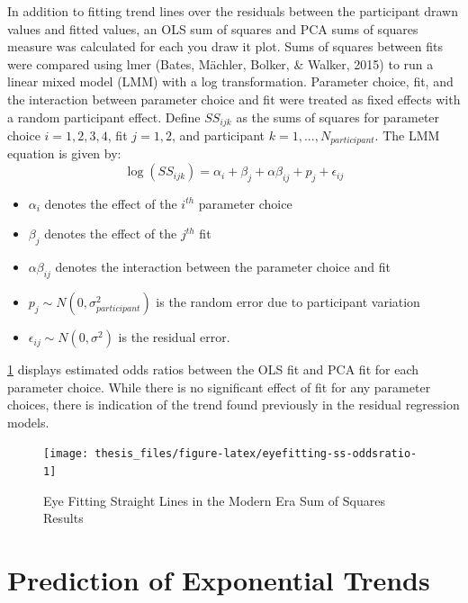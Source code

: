\documentclass[print]{nuthesis}
\providecommand{\tightlist}{%
  \setlength{\itemsep}{0pt}\setlength{\parskip}{0pt}}
\begin{document}
In addition to fitting trend lines over the residuals between the participant drawn values and fitted values, an OLS sum of squares and PCA sums of squares measure was calculated for each you draw it plot.
Sums of squares between fits were compared using lmer (Bates, Mächler, Bolker, \& Walker, 2015) to run a linear mixed model (LMM) with a log transformation.
Parameter choice, fit, and the interaction between parameter choice and fit were treated as fixed effects with a random participant effect.
Define \(SS_{ijk}\) as the sums of squares for parameter choice \(i = 1,2,3,4\), fit \(j=1,2\), and participant \(k = 1,...,N_{participant}\).
The LMM equation is given by:
\begin{equation}
\log\left(SS_{ijk}\right) = \alpha_i + \beta_j + \alpha\beta_{ij} + p_{j} + \epsilon_{ij}
\end{equation}

\begin{itemize}
\tightlist
\item
  \(\alpha_i\) denotes the effect of the \(i^{th}\) parameter choice
\item
  \(\beta_j\) denotes the effect of the \(j^{th}\) fit
\item
  \(\alpha\beta_{ij}\) denotes the interaction between the parameter choice and fit
\item
  \(p_{j} \sim N(0, \sigma^2_{participant})\) is the random error due to participant variation
\item
  \(\epsilon_{ij} \sim N(0, \sigma^2)\) is the residual error.
\end{itemize}

\cref{fig:eyefitting-ss-oddsratio} displays estimated odds ratios between the OLS fit and PCA fit for each parameter choice.
While there is no significant effect of fit for any parameter choices, there is indication of the trend found previously in the residual regression models.

\begin{figure}[tbp]

{\centering \texttt{[image: thesis\_files/figure-latex/eyefitting-ss-oddsratio-1]} 

}

\caption{Eye Fitting Straight Lines in the Modern Era Sum of Squares Results}\label{fig:eyefitting-ss-oddsratio}
\end{figure}

\hypertarget{prediction-of-exponential-trends}{%
\section{Prediction of Exponential Trends}\label{prediction-of-exponential-trends}}
\end{document}
